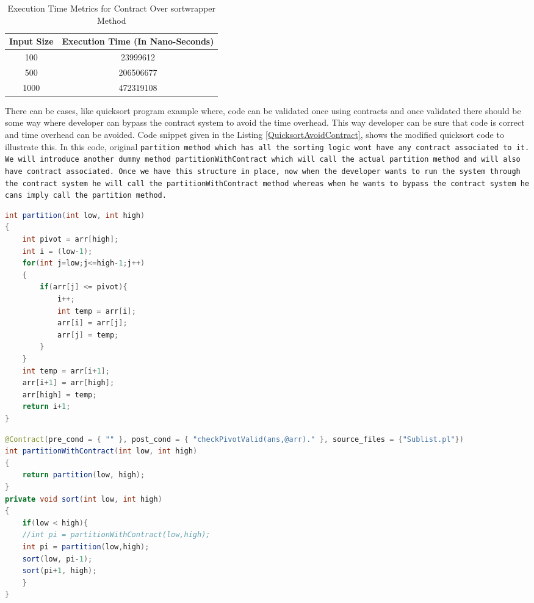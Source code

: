 \begin{table}[htb]
\caption{Execution Time Metrics for Contract Over sortwrapper Method\label{tab:SortWithContract}}
\begin{center}
\begin{tabular}{c||c}
\hline
Input Size & Execution Time (In Nano-Seconds) \\
\hline
\hline
100 & 23999612\\
500 & 206506677\\
1000 & 472319108\\

\hline
\end{tabular}
\end{center}
\end{table}

There can be cases, like quicksort program example where, code can be validated once using contracts and once validated there should be some way where developer can bypass the contract system to avoid the time overhead. This way developer can be sure that code is correct and time overhead can be avoided. Code snippet given in the Listing \ref{QuicksortAvoidContract}, shows the modified quicksort code to illustrate this. In this code, original \tt{partition} method which has all the sorting logic wont have any contract associated to it. We will introduce another dummy method \tt{partitionWithContract} which will call the actual \tt{partition} method and will also have contract associated. Once we have this structure in place, now when the developer wants to run the system through the contract system he will call the \tt{partitionWithContract} method whereas when he wants to bypass the contract system he cans imply call the \tt{partition} method.\linebreak

\begin{minipage}{\linewidth}
\begin{lstlisting}[frame=single, language=Java, captionpos=b, breaklines=true]
int partition(int low, int high)
{
	int pivot = arr[high];
	int i = (low-1);
	for(int j=low;j<=high-1;j++)
	{
		if(arr[j] <= pivot){
			i++;
			int temp = arr[i];
			arr[i] = arr[j];
			arr[j] = temp;
		}
	}
	int temp = arr[i+1];
	arr[i+1] = arr[high];
	arr[high] = temp;
	return i+1;
}
\end{lstlisting}
\end{minipage}

\begin{minipage}{\linewidth}
\begin{lstlisting}[frame=single, language=Java, caption={Quicksort Program with Contract - 3}, label={QuicksortAvoidContract}, captionpos=b, breaklines=true]	
@Contract(pre_cond = { "" }, post_cond = { "checkPivotValid(ans,@arr)." }, source_files = {"Sublist.pl"})
int partitionWithContract(int low, int high)
{
	return partition(low, high);
}	
private void sort(int low, int high)
{
	if(low < high){
	//int pi = partitionWithContract(low,high);
	int pi = partition(low,high);
	sort(low, pi-1);
	sort(pi+1, high);
	}
}

\end{lstlisting}
\end{minipage}

